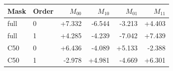 \begin{tabular}{@{}llrrrr@{}}
\toprule
Mask & Order & $M_{00}$ & $M_{10}$ & $M_{01}$ & $M_{11}$ \\
\midrule
full & 0 & +7.332 & -6.544 & -3.213 & +4.403 \\
full & 1 & +4.285 & -4.239 & -7.042 & +7.439 \\
C50 & 0 & +6.436 & -4.089 & +5.133 & -2.388 \\
C50 & 1 & -2.978 & +4.981 & -4.669 & +6.301 \\
\bottomrule
\end{tabular}
